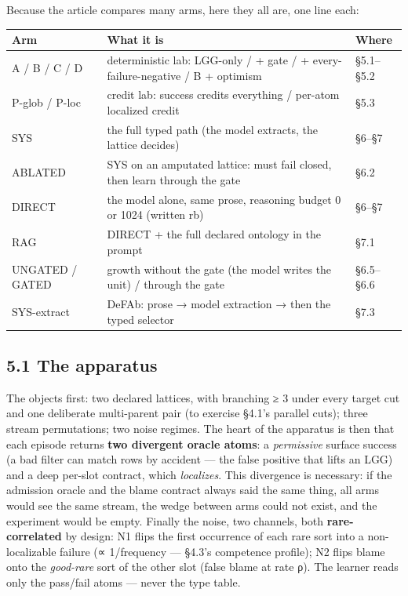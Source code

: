\documentclass[11pt]{article}
\begin{document}
Because the article compares many arms, here they all are, one line each:

\begin{center}\small\begin{tabular}{lll}\toprule
Arm & What it is & Where \\ \midrule
A / B / C / D & deterministic lab: LGG-only / + gate / + every-failure-negative / B + optimism & §5.1–§5.2 \\
P-glob / P-loc & credit lab: success credits everything / per-atom localized credit & §5.3 \\
SYS & the full typed path (the model extracts, the lattice decides) & §6–§7 \\
ABLATED & SYS on an amputated lattice: must fail closed, then learn through the gate & §6.2 \\
DIRECT & the model alone, same prose, reasoning budget 0 or 1024 (written rb) & §6–§7 \\
RAG & DIRECT + the full declared ontology in the prompt & §7.1 \\
UNGATED / GATED & growth without the gate (the model writes the unit) / through the gate & §6.5–§6.6 \\
SYS-extract & DeFAb: prose → model extraction → then the typed selector & §7.3 \\
\bottomrule\end{tabular}\end{center}

\subsection*{5.1 The apparatus}

The objects first: two declared lattices, with branching ≥ 3 under every target cut and one deliberate multi-parent pair (to exercise §4.1's parallel cuts); three stream permutations; two noise regimes. The heart of the apparatus is then that each episode returns \textbf{two divergent oracle atoms}: a \emph{permissive} surface success (a bad filter can match rows by accident — the false positive that lifts an LGG) and a deep per-slot contract, which \emph{localizes}. This divergence is necessary: if the admission oracle and the blame contract always said the same thing, all arms would see the same stream, the wedge between arms could not exist, and the experiment would be empty. Finally the noise, two channels, both \textbf{rare-correlated} by design: N1 flips the first occurrence of each rare sort into a non-localizable failure (∝ 1/frequency — §4.3's competence profile); N2 flips blame onto the \emph{good-rare} sort of the other slot (false blame at rate ρ). The learner reads only the pass/fail atoms — never the type table.
\end{document}
